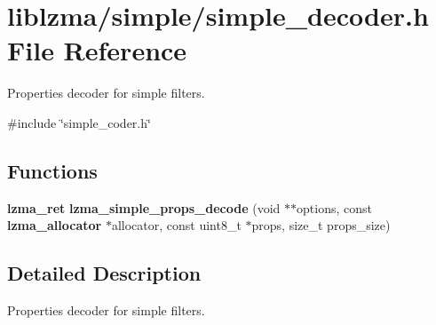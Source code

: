 \section{liblzma/simple/simple\+\_\+decoder.h File Reference}
\label{simple__decoder_8h}


Properties decoder for simple filters.  


{\ttfamily \#include \char`\"{}simple\+\_\+coder.\+h\char`\"{}}\newline
\subsection*{Functions}
\begin{DoxyCompactItemize}
\item 
\mbox{\label{simple__decoder_8h_ae439ee0abc0a7b2d28d1be83b449d3e4}} 
\textbf{ lzma\+\_\+ret} {\bfseries lzma\+\_\+simple\+\_\+props\+\_\+decode} (void $\ast$$\ast$options, const \textbf{ lzma\+\_\+allocator} $\ast$allocator, const uint8\+\_\+t $\ast$props, size\+\_\+t props\+\_\+size)
\end{DoxyCompactItemize}


\subsection{Detailed Description}
Properties decoder for simple filters. 

